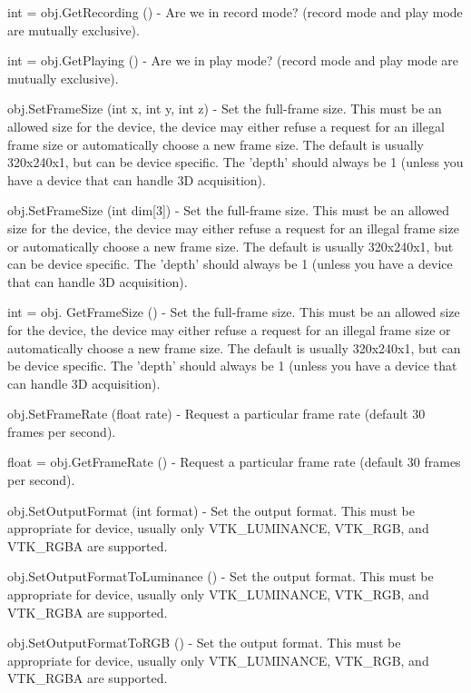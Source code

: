 \begin{DoxyItemize}
\item {\ttfamily int = obj.\-Get\-Recording ()} -\/ Are we in record mode? (record mode and play mode are mutually exclusive).  
\item {\ttfamily int = obj.\-Get\-Playing ()} -\/ Are we in play mode? (record mode and play mode are mutually exclusive).  
\item {\ttfamily obj.\-Set\-Frame\-Size (int x, int y, int z)} -\/ Set the full-\/frame size. This must be an allowed size for the device, the device may either refuse a request for an illegal frame size or automatically choose a new frame size. The default is usually 320x240x1, but can be device specific. The 'depth' should always be 1 (unless you have a device that can handle 3\-D acquisition).  
\item {\ttfamily obj.\-Set\-Frame\-Size (int dim\mbox{[}3\mbox{]})} -\/ Set the full-\/frame size. This must be an allowed size for the device, the device may either refuse a request for an illegal frame size or automatically choose a new frame size. The default is usually 320x240x1, but can be device specific. The 'depth' should always be 1 (unless you have a device that can handle 3\-D acquisition).  
\item {\ttfamily int = obj. Get\-Frame\-Size ()} -\/ Set the full-\/frame size. This must be an allowed size for the device, the device may either refuse a request for an illegal frame size or automatically choose a new frame size. The default is usually 320x240x1, but can be device specific. The 'depth' should always be 1 (unless you have a device that can handle 3\-D acquisition).  
\item {\ttfamily obj.\-Set\-Frame\-Rate (float rate)} -\/ Request a particular frame rate (default 30 frames per second).  
\item {\ttfamily float = obj.\-Get\-Frame\-Rate ()} -\/ Request a particular frame rate (default 30 frames per second).  
\item {\ttfamily obj.\-Set\-Output\-Format (int format)} -\/ Set the output format. This must be appropriate for device, usually only V\-T\-K\-\_\-\-L\-U\-M\-I\-N\-A\-N\-C\-E, V\-T\-K\-\_\-\-R\-G\-B, and V\-T\-K\-\_\-\-R\-G\-B\-A are supported.  
\item {\ttfamily obj.\-Set\-Output\-Format\-To\-Luminance ()} -\/ Set the output format. This must be appropriate for device, usually only V\-T\-K\-\_\-\-L\-U\-M\-I\-N\-A\-N\-C\-E, V\-T\-K\-\_\-\-R\-G\-B, and V\-T\-K\-\_\-\-R\-G\-B\-A are supported.  
\item {\ttfamily obj.\-Set\-Output\-Format\-To\-R\-G\-B ()} -\/ Set the output format. This must be appropriate for device, usually only V\-T\-K\-\_\-\-L\-U\-M\-I\-N\-A\-N\-C\-E, V\-T\-K\-\_\-\-R\-G\-B, and V\-T\-K\-\_\-\-R\-G\-B\-A are supported.  

\end{DoxyItemize}

